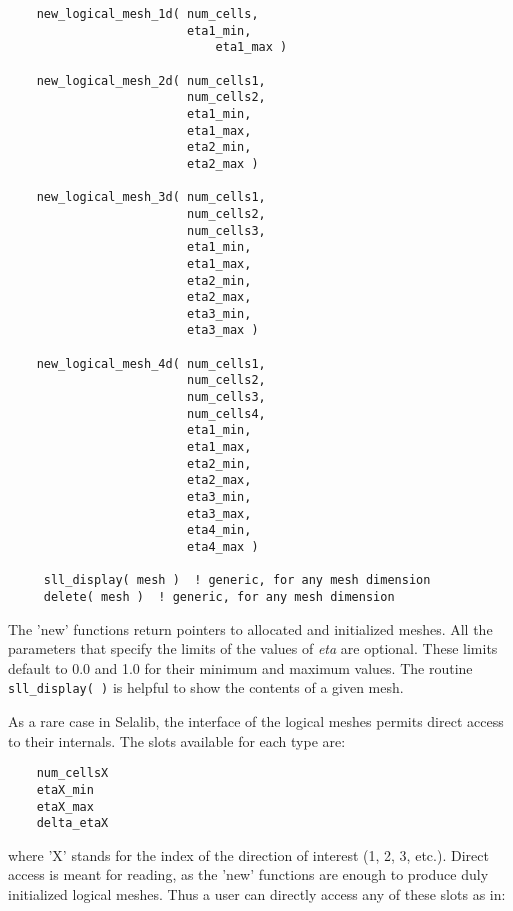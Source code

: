 \documentclass[]{report}   %
\begin{document}
     \begin{verbatim}
    new_logical_mesh_1d( num_cells,         
                         eta1_min, 
	                         eta1_max )
	                                              
    new_logical_mesh_2d( num_cells1, 
                         num_cells2, 
                         eta1_min, 
                         eta1_max, 
                         eta2_min, 
                         eta2_max )
                              
    new_logical_mesh_3d( num_cells1, 
                         num_cells2,
                         num_cells3, 
                         eta1_min, 
                         eta1_max, 
                         eta2_min, 
                         eta2_max, 
                         eta3_min, 
                         eta3_max )
                             
    new_logical_mesh_4d( num_cells1, 
                         num_cells2,
                         num_cells3,
                         num_cells4, 
                         eta1_min, 
                         eta1_max, 
                         eta2_min, 
                         eta2_max, 
                         eta3_min, 
                         eta3_max, 
                         eta4_min, 
                         eta4_max )          
                              
     sll_display( mesh )  ! generic, for any mesh dimension      
     delete( mesh )  ! generic, for any mesh dimension
     \end{verbatim}


The 'new' functions return pointers to allocated and initialized meshes. All the parameters that specify the limits of the values of \emph{eta} are optional. These limits default to 0.0 and 1.0 for their minimum and maximum values. The routine \verb+sll_display( )+ is helpful to show the contents of a given mesh.


As a rare case in Selalib, the interface of the logical meshes permits direct access to their internals. The slots available for each type are:

\begin{verbatim}
    num_cellsX
    etaX_min
    etaX_max
    delta_etaX
\end{verbatim}
where 'X' stands for the index of the direction of interest (1, 2, 3, etc.). Direct access is meant for reading, as the 'new' functions are enough to produce duly initialized logical meshes. Thus a user can directly access any of these slots as in:
\end{document}
